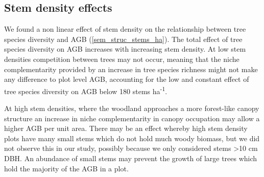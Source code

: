 \documentclass[11pt,a4paper]{article}
\begin{document}

\subsection{Stem density effects}

We found a non linear effect of stem density on the relationship between tree species diversity and AGB (\autoref{sem_struc_stems_ha}). The total effect of tree species diversity on AGB increases with increasing stem density. At low stem densities competition between trees may not occur, meaning that the niche complementarity provided by an increase in tree species richness might not make any difference to plot level AGB, accounting for the low and constant effect of tree species diversity on AGB below \textapprox{}180 stems ha\textsuperscript{-1}.

At high stem densities, where the woodland approaches a more forest-like canopy structure an increase in niche complementarity in canopy occupation may allow a higher AGB per unit area. There may be an effect whereby high stem density plots have many small stems which do not hold much woody biomass, but we did not observe this in our study, possibly because we only considered stems >10 cm DBH. An abundance of small stems may prevent the growth of large trees which hold the majority of the AGB in a plot.



\end{document}
